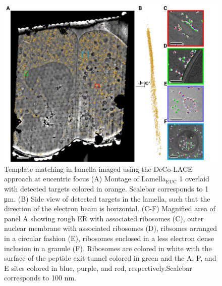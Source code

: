 \documentclass[
]{article}
\begin{document}
\begin{figure}
\hypertarget{fig:matching_euc}{%
\centering
\includegraphics{figures/matching_euc.png}
\caption{Template matching in lamella imaged using the DeCo-LACE approach at eucentric
focus (A) Montage of Lamella\(_\textrm{EUC}\) 1 overlaid with detected targets colored in orange. Scalebar corresponds to 1 μm. (B) Side view of detected targets in the lamella, such that the
direction of the electron beam is horizontal. (C-F) Magnified area of panel A
showing rough ER with associated ribosomes (C), outer nuclear membrane with
associated ribosomes (D), ribsomes arranged in a circular fashion (E), ribosomes
enclosed in a less electron dense inclusion in a granule (F). Ribosomes are colored in white with the surface of the peptide exit tunnel colored in green and the A, P, and E sites colored in blue, purple, and red, respectively.Scalebar corresponds to 100 nm.}\label{fig:matching_euc}
}
\end{figure}
\end{document}
